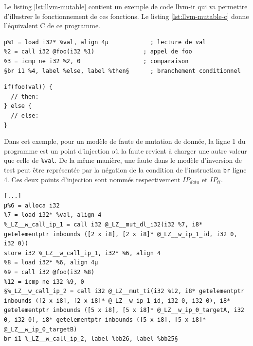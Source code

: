             Le listing \ref{lst:llvm-mutable} contient un exemple de code \gls{llvm-ir} qui va permettre d'illustrer le fonctionnement de ces fonctions. Le listing \ref{lst:llvm-mutable-c} donne l'équivalent C de ce programme. 
            
            \begin{minipage}{0.93\linewidth}
            \begin{lstlisting}[style=base, caption={IR LLVM source}, label=lst:llvm-mutable]
µ%1 = load i32* %val, align 4µ            ; lecture de val
%2 = call i32 @foo(i32 %1)              ; appel de foo
%3 = icmp ne i32 %2, 0                  ; comparaison
§br i1 %4, label %else, label %then§      ; branchement conditionnel

\end{lstlisting}      
                
            \begin{lstlisting}[style=base, caption={Équivalent en langage C}, label=lst:llvm-mutable-c]
if(foo(val)) {
  // then:
} else {
  // else:
}
            \end{lstlisting} 
            \end{minipage}
            
            Dans cet exemple, pour un modèle de faute de mutation de donnée, la ligne 1 du programme est un point d'injection où la faute revient à charger une autre valeur que celle de \texttt{\%val}. De la même manière, une faute dans le modèle d'inversion de test peut être représentée par la négation de la condition de l'instruction \texttt{br} ligne 4. Ces deux points d'injection sont nommés respectivement $IP_{data}$ et $IP_{ti}$. 
         
            \begin{minipage}{0.93\linewidth}
            \begin{lstlisting}[style=base, caption={IR LLVM muté}, label=lst:llvm-mutated]
[...]
µ%6 = alloca i32
%7 = load i32* %val, align 4
%_LZ__w_call_ip_1 = call i32 @_LZ__mut_dl_i32(i32 %7, i8* getelementptr inbounds ([2 x i8], [2 x i8]* @_LZ__w_ip_1_id, i32 0, i32 0))
store i32 %_LZ__w_call_ip_1, i32* %6, align 4
%8 = load i32* %6, align 4µ
%9 = call i32 @foo(i32 %8)
%12 = icmp ne i32 %9, 0
§%_LZ__w_call_ip_2 = call i32 @_LZ__mut_ti(i32 %12, i8* getelementptr inbounds ([2 x i8], [2 x i8]* @_LZ__w_ip_1_id, i32 0, i32 0), i8* getelementptr inbounds ([5 x i8], [5 x i8]* @_LZ__w_ip_0_targetA, i32 0, i32 0), i8* getelementptr inbounds ([5 x i8], [5 x i8]* @_LZ__w_ip_0_targetB) 
br i1 %_LZ__w_call_ip_2, label %bb26, label %bb25§
            \end{lstlisting}
            \end{minipage}
            
